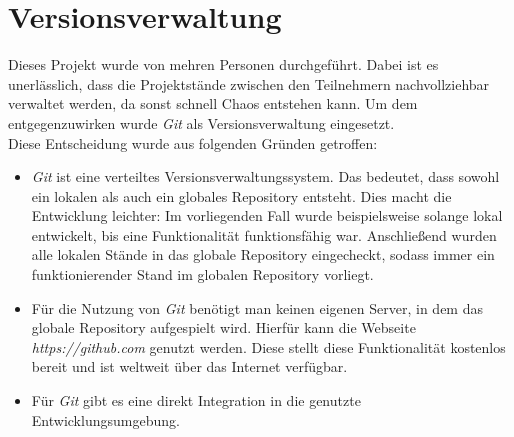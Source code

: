 \section{Versionsverwaltung}
\label{sec:versionsverwaltung}
Dieses Projekt wurde von mehren Personen durchgeführt. Dabei ist es unerlässlich, dass die Projektstände zwischen den Teilnehmern nachvollziehbar verwaltet werden, da sonst schnell Chaos entstehen kann. Um dem entgegenzuwirken wurde \textit{Git} als Versionsverwaltung eingesetzt. \\
Diese Entscheidung wurde aus folgenden Gründen getroffen:
\begin{itemize}
\item \textit{Git} ist eine verteiltes Versionsverwaltungssystem. Das bedeutet, dass sowohl ein lokalen als auch ein globales Repository entsteht. Dies macht die Entwicklung leichter: Im vorliegenden Fall wurde beispielsweise solange lokal entwickelt, bis eine Funktionalität funktionsfähig war. Anschließend wurden alle lokalen Stände in das globale Repository eingecheckt, sodass immer ein funktionierender Stand im globalen Repository vorliegt. 
\item Für die Nutzung von \textit{Git} benötigt man keinen eigenen Server, in dem das globale Repository aufgespielt wird. Hierfür kann die Webseite \textit{https://github.com} genutzt werden. Diese stellt diese Funktionalität kostenlos bereit und ist weltweit über das Internet verfügbar. 
\item Für \textit{Git} gibt es eine direkt Integration in die genutzte Entwicklungsumgebung.
\end{itemize}